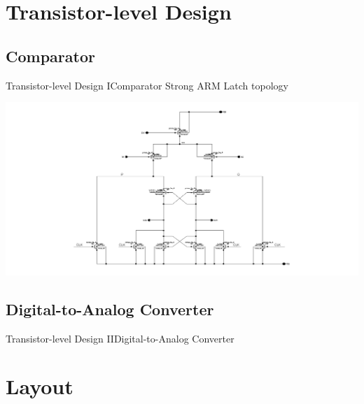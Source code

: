 \documentclass{beamer}
\begin{document}
 \section{Transistor-level Design}
 \subsection{Comparator}
 \begin{frame}{Transistor-level Design I}{Comparator}
  Strong ARM Latch topology

  \includegraphics[width=\textwidth]{img/comp_sch}
 \end{frame}
 \subsection{Digital-to-Analog Converter}
 \begin{frame}{Transistor-level Design II}{Digital-to-Analog Converter}
  \centering
 \end{frame}
 \section{Layout}
\end{document}
